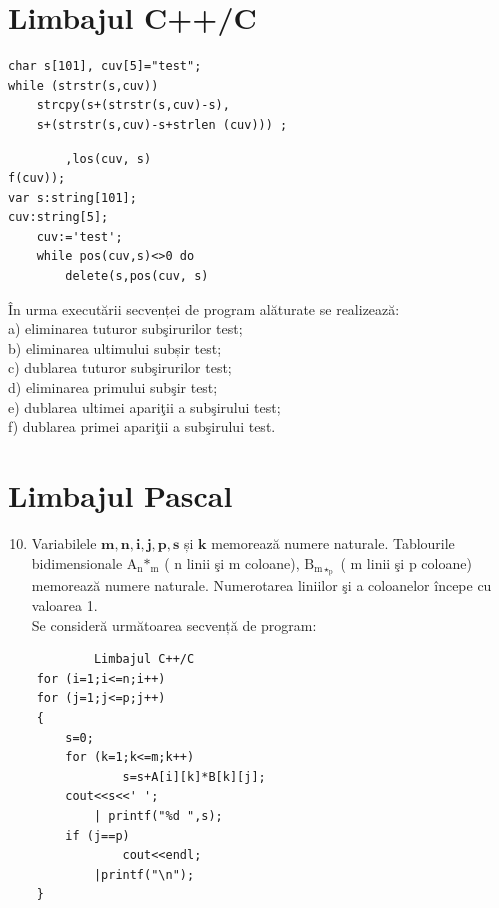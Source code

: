 \documentclass[10pt]{article}
\begin{document}
\section*{Limbajul C++/C}
\begin{verbatim}
char s[101], cuv[5]="test";
while (strstr(s,cuv))
    strcpy(s+(strstr(s,cuv)-s),
    s+(strstr(s,cuv)-s+strlen (cuv))) ;
\end{verbatim}

\begin{verbatim}
        ,los(cuv, s)
f(cuv));
var s:string[101];
cuv:string[5];
    cuv:='test';
    while pos(cuv,s)<>0 do
        delete(s,pos(cuv, s)
\end{verbatim}

În urma executării secvenței de program alăturate se realizează:\\
a) eliminarea tuturor subşirurilor test;\\
b) eliminarea ultimului subșir test;\\
c) dublarea tuturor subşirurilor test;\\
d) eliminarea primului subşir test;\\
e) dublarea ultimei apariţii a subşirului test;\\
f) dublarea primei apariţii a subşirului test.

\section*{Limbajul Pascal}
\begin{enumerate}
  \setcounter{enumi}{9}
  \item Variabilele $\mathbf{m}, \mathbf{n}, \mathbf{i}, \mathbf{j}, \mathbf{p}, \mathbf{s}$ și $\mathbf{k}$ memorează numere naturale. Tablourile bidimensionale $\mathrm{A}_{\mathrm{n}} \mathrm{*}_{\mathrm{m}}$ ( n linii şi m coloane), $\mathrm{B}_{\mathrm{m} \star_{\mathrm{p}}}$ ( m linii şi p coloane) memorează numere naturale. Numerotarea liniilor şi a coloanelor începe cu valoarea 1.\\
Se consideră următoarea secvență de program:
\end{enumerate}

\begin{verbatim}
            Limbajul C++/C
    for (i=1;i<=n;i++)
    for (j=1;j<=p;j++)
    {
        s=0;
        for (k=1;k<=m;k++)
                s=s+A[i][k]*B[k][j];
        cout<<s<<' ';
            | printf("%d ",s);
        if (j==p)
                cout<<endl;
            |printf("\n");
    }
\end{verbatim}
\end{document}
